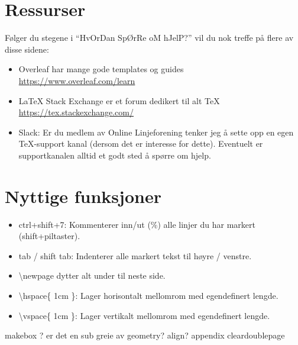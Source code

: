 \section{Ressurser}
    Følger du stegene i ``HvOrDan SpØrRe oM hJelP?'' vil du nok treffe på flere av disse sidene:
    \begin{itemize}
        \item Overleaf har mange gode templates og guides\\ \url{https://www.overleaf.com/learn}
        \item \LaTeX{} Stack Exchange er et forum dedikert til alt \TeX{}\\ \url{https://tex.stackexchange.com/} 
        \item Slack: Er du medlem av Online Linjeforening tenker jeg å sette opp en egen TeX-support kanal (dersom det er interesse for dette). Eventuelt er supportkanalen alltid et godt sted å spørre om hjelp.
    \end{itemize}
    

\section{Nyttige funksjoner}
    \begin{itemize}
        \item ctrl+shift+7: Kommenterer inn/ut (\%) alle linjer du har markert (shift+piltaster).
        \item tab / shift tab: Indenterer alle markert tekst til høyre / venstre.
        \item \textbackslash newpage dytter alt under til neste side.
        \item \textbackslash hspace\{ 1cm \}: Lager horisontalt mellomrom med egendefinert lengde.
        \item \textbackslash vspace\{ 1cm \}: Lager vertikalt mellomrom med egendefinert lengde.
    \end{itemize}
    makebox ? er det en sub greie av geometry?
    align?
    appendix
    cleardoublepage
    


